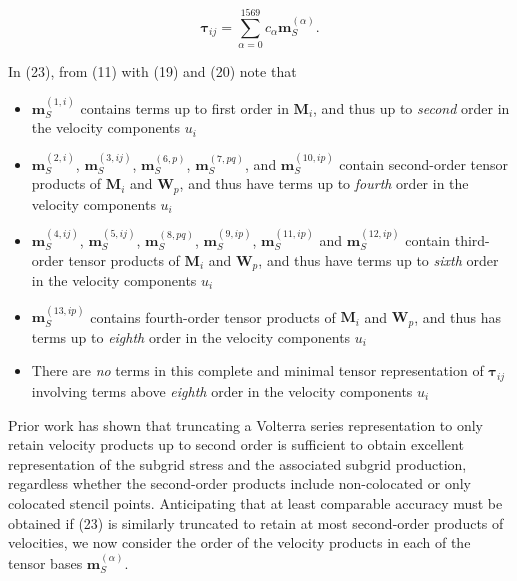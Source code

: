 %
\begin{equation}
	\label{E:40}
	\mathbf{\tau}_{ij} = \sum_{\alpha=0}^{1569} c_{\alpha} \mathbf{m}^{(\alpha)}_{S}.
\end{equation}
%
% 


In (23), from (11) with (19) and (20) note that

%
\begin{itemize}
%
	\item	$\mathbf{m}^{(1,i)}_{S}$ contains terms up to first order in $\mathbf{M}_{i}$, and thus up to \textit{second} order in the velocity components $u_i$ 
%	
	\item	$\mathbf{m}^{(2,i)}_{S}$, $\mathbf{m}^{(3,ij)}_{S}$, $\mathbf{m}^{(6,p)}_{S}$, $\mathbf{m}^{(7,pq)}_{S}$, and $\mathbf{m}^{(10,ip)}_{S}$  contain second-order tensor products of  $\mathbf{M}_{i}$  and $\mathbf{W}_{p}$, and thus have terms up to \textit{fourth} order in the velocity components  $u_i$ 
%	
	\item	 $\mathbf{m}^{(4,ij)}_{S}$, $\mathbf{m}^{(5,ij)}_{S}$, $\mathbf{m}^{(8,pq)}_{S}$, $\mathbf{m}^{(9,ip)}_{S}$, $\mathbf{m}^{(11,ip)}_{S}$ and $\mathbf{m}^{(12,ip)}_{S}$ contain third-order tensor products of $\mathbf{M}_{i}$  and $\mathbf{W}_{p}$, and thus have terms up to \textit{sixth} order in the velocity components $u_i$ 
%	
	\item	 $\mathbf{m}^{(13,ip)}_{S}$  contains fourth-order tensor products of $\mathbf{M}_{i}$  and $\mathbf{W}_{p}$, and thus has terms up to \textit{eighth} order in the velocity components $u_i$
%	
	\item	There are \textit{no} terms in this complete and minimal tensor representation of $\mathbf{\tau}_{ij}$  involving terms above \textit{eighth} order in the velocity components $u_i$
%
\end{itemize}
%
%   


Prior work has shown that truncating a Volterra series representation to only retain velocity products up to second order is sufficient to obtain excellent representation of the subgrid stress and the associated subgrid production, regardless whether the second-order products include non-colocated or only colocated stencil points.  Anticipating that at least comparable accuracy must be obtained if (23) is similarly truncated to retain at most second-order products of velocities, we now consider the order of the velocity products in each of the tensor bases  $\mathbf{m}^{(\alpha)}_{S}$.

